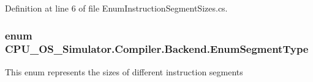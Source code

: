 Definition at line 6 of file Enum\+Instruction\+Segment\+Sizes.\+cs.

\hypertarget{namespace_c_p_u___o_s___simulator_1_1_compiler_1_1_backend_a39bd0e4034345155514db8f136c9c639}{}
\subsubsection[{Enum\+Segment\+Type}]{\setlength{\rightskip}{0pt plus 5cm}enum {\bf C\+P\+U\+\_\+\+O\+S\+\_\+\+Simulator.\+Compiler.\+Backend.\+Enum\+Segment\+Type}\hspace{0.3cm}{\ttfamily [strong]}}\label{namespace_c_p_u___o_s___simulator_1_1_compiler_1_1_backend_a39bd0e4034345155514db8f136c9c639}


This enum represents the sizes of different instruction segments 

